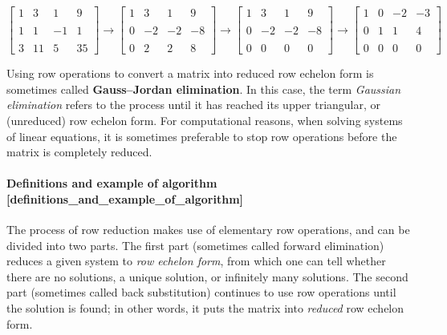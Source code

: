 $$\begin{bmatrix}
1 & 3 & 1 & 9 \\\\
1 & 1 & -1 & 1 \\\\
3 & 11 & 5 & 35
\end{bmatrix}\to
\begin{bmatrix}
1 & 3 & 1 & 9 \\\\
0 & -2 & -2 & -8 \\\\
0 & 2 & 2 & 8
\end{bmatrix}\to
\begin{bmatrix}
1 & 3 & 1 & 9 \\\\
0 & -2 & -2 & -8 \\\\
0 & 0 & 0 & 0
\end{bmatrix}\to
\begin{bmatrix}
1 & 0 & -2 & -3 \\\\
0 & 1 & 1 & 4 \\\\
0 & 0 & 0 & 0
\end{bmatrix}$$

Using row operations to convert a matrix into reduced row echelon form
is sometimes called \textbf{Gauss–Jordan elimination}. In this case, the term
\textit{Gaussian elimination} refers to the process until it has reached its
upper triangular, or (unreduced) row echelon form. For computational
reasons, when solving systems of linear equations, it is sometimes
preferable to stop row operations before the matrix is completely
reduced.

\paragraph{Definitions and example of algorithm [definitions\_and\_example\_of\_algorithm]}

The process of row reduction makes use of elementary row operations, and
can be divided into two parts. The first part (sometimes called forward
elimination) reduces a given system to \textit{row echelon form}, from which
one can tell whether there are no solutions, a unique solution, or
infinitely many solutions. The second part (sometimes called back
substitution) continues to use row operations until the solution is
found; in other words, it puts the matrix into \textit{reduced} row echelon
form.

